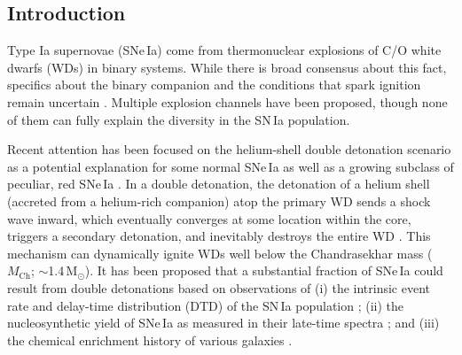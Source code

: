 \documentclass[twocolumn]{aastex631}
\newcommand{\Mch}{$M_\mathrm{Ch}$}
\newcommand{\chang}[1]{\textcolor{blue}{[Chang: #1]}}
\begin{document}
\begin{CJK*}{UTF8}{gbsn}

\section{Introduction} \label{sec:intro}
Type Ia supernovae (SNe\,Ia) come from thermonuclear explosions of C/O white dwarfs (WDs) in binary systems. While there is broad consensus about this fact, specifics about the binary companion and the conditions that spark ignition remain uncertain \citep[see][for a review]{Maoz_2014, Liu_2023}. Multiple explosion channels have been proposed, though none of them can fully explain the diversity in the SN\,Ia population.

Recent attention has been focused on the helium-shell double detonation scenario as a potential explanation for some normal SNe\,Ia \citep[e.g.,][]{polin_observational_2019,Shen_2D_2021} as well as a growing subclass of peculiar, red SNe\,Ia \citep[e.g.,][]{jiang_16jhr_2017, de_18byg_2019,Ni_2022, Liu_20jgb_2023}. In a double detonation, the detonation of a helium shell (accreted from a helium-rich companion) atop the primary WD sends a shock wave inward, %
which eventually converges at some location within the core, triggers a secondary detonation, and inevitably destroys the entire WD \citep{Nomoto_1982a,Nomoto_1982b,Woosley_1986,Livne_1990,Woosley_1994,Livne_1995}. This mechanism can dynamically ignite WDs well below the Chandrasekhar mass (\Mch; $\sim$1.4\,$\mathrm{M_\odot}$). It has been proposed that a substantial fraction of SNe\,Ia could result from double detonations based on observations of (i) the intrinsic event rate and delay-time distribution (DTD) of the SN\,Ia population \citep{Ruiter_2011,Ruiter_2014}; (ii) the nucleosynthetic yield of SNe\,Ia as measured in their late-time spectra \citep{Maguire_2018,Flors_2020}; and (iii) the chemical enrichment history of various galaxies \citep{Kirby_2019,de_los_reyes_manganese_2020,Sanders_2021,Eitner_2022}. 


\end{CJK*}
\end{document}
